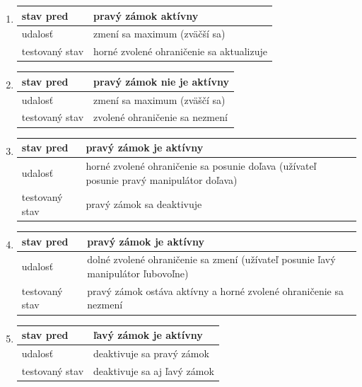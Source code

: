 \documentclass[
  printed, %
  twoside, %
  notable,   %
  nolof,   %
  nolot,   %
]{fithesis3}
\begin{document}
\begin{enumerate}
  \item
  \begin{tabular}{ | p{2.75cm} | p{8cm} | }
    \hline
    stav pred & pravý zámok aktívny \\ \hline
    udalosť & zmení sa maximum (zväčší sa)\\ \hline
    testovaný stav & horné zvolené ohraničenie sa aktualizuje \\ \hline
  \end{tabular}

  \item
  \begin{tabular}{ | p{2.75cm} | p{8cm} | }
    \hline
    stav pred & pravý zámok nie je aktívny \\ \hline
    udalosť & zmení sa maximum (zväščí sa)\\ \hline
    testovaný stav & zvolené ohraničenie sa nezmení \\ \hline
  \end{tabular}

  \item
  \begin{tabular}{ | p{2.75cm} | p{8cm} | }
    \hline
    stav pred & pravý zámok je aktívny \\ \hline
    udalosť & horné zvolené ohraničenie sa posunie doľava (užívateľ posunie pravý manipulátor doľava)\\ \hline
    testovaný stav & pravý zámok sa deaktivuje \\ \hline
  \end{tabular}

  \item
  \begin{tabular}{ | p{2.75cm} | p{8cm} | }
    \hline
    stav pred & pravý zámok je aktívny \\ \hline
    udalosť & dolné zvolené ohraničenie sa zmení (užívateľ posunie ľavý manipulátor ľubovoľne)\\ \hline
    testovaný stav & pravý zámok ostáva aktívny a horné zvolené ohraničenie sa nezmení \\ \hline
  \end{tabular}

  \item
  \begin{tabular}{ | p{2.75cm} | p{8cm} | }
    \hline
    stav pred & ľavý zámok je aktívny \\ \hline
    udalosť & deaktivuje sa pravý zámok \\ \hline
    testovaný stav & deaktivuje sa aj ľavý zámok \\ \hline
  \end{tabular}


\end{enumerate}
\end{document}
